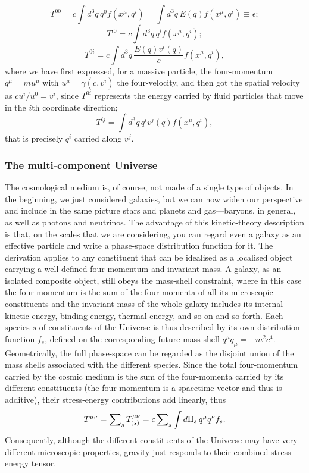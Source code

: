 \begin{equation}
    T^{00} = c\int d^3q\,q^0f(x^\mu,q^i) = \int d^3q\,E(q)f(x^\mu,q^i) \equiv \epsilon;
\end{equation}
\begin{equation}
    T^{i0} = c\int d^3q\,q^if(x^\mu,q^i);
\end{equation}
\begin{equation}
    T^{0i} = c \int d^3q\,\frac{E(q)v^i(q)}{c}f(x^\mu,q^i),
\end{equation}
where we have first expressed, for a massive particle, the four-momentum $q^\mu = m u^\mu$ with $u^\mu = \gamma(c,v^i)$ the four-velocity, and then got the spatial velocity as $cu^i/u^0 = v^i$, since $T^{0i}$ represents the energy carried by fluid particles that move in the $i$th coordinate direction; 
\begin{equation}
    T^{ij} = \int d^3q\,q^iv^j(q)f(x^\mu,q^i),
\end{equation}
that is precisely $q^i$ carried along $v^j$. 

\subsubsection{The multi-component Universe}
The cosmological medium is, of course, not made of a single type of objects. In the beginning, we just considered galaxies, but we can now widen our perspective and include in the same picture stars and planets and gas—baryons, in general, as well as photons and neutrinos. The advantage of this kinetic-theory description is that, on the scales that we are considering, you can regard even a galaxy as an effective particle and write a phase-space distribution function for it. The derivation applies to any constituent that can be idealised as a localised object carrying a well-defined four-momentum and invariant mass. A galaxy, as an isolated composite object, still obeys the mass-shell constraint, where in this case the four-momentum is the sum of the four-momenta of all its microscopic constituents and the invariant mass of the whole galaxy includes its internal kinetic energy, binding energy, thermal energy, and so on and so forth. Each species $s$ of constituents of the Universe is thus described by its own distribution function $f_s$, defined on the corresponding future mass shell $q^\mu q_\mu = -m^2c^4$. Geometrically, the full phase-space can be regarded as the disjoint union of the mass shells associated with the different species. Since the total four-momentum carried by the cosmic medium is the sum of the four-momenta carried by its different constituents (the four-momentum is a spacetime vector and thus is additive), their stress-energy contributions add linearly, thus 
\begin{eqnarray}
    T^{\mu\nu} = \sum\nolimits_s T^{\mu\nu}_{(s)} = c\sum\nolimits_s \int d\Pi_s\,q^\mu q^\nu f_s.
\end{eqnarray}
Consequently, although the different constituents of the Universe may have very different microscopic properties, gravity just responds to their combined stress-energy tensor.

